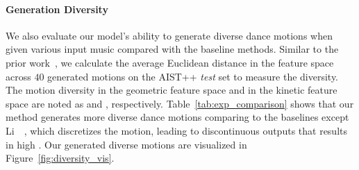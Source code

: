 \paragraph{Generation Diversity}
We also evaluate our model's ability to generate {diverse dance motions when given various input music} compared with the baseline methods. Similar to the prior work~\cite{huang2021}, we calculate the {average Euclidean distance in the feature space across} $40$ generated motions on the AIST++ \emph{test} set  to measure the diversity. The motion diversity in the geometric feature space and in the kinetic feature space are noted as \Divm and \Divk, respectively.
Table~\ref{tab:exp_comparison} shows that our method generates more diverse dance motions comparing to the baselines {except Li~\etal~\cite{li2020learning}, which discretizes the motion, leading to discontinuous outputs that results in high \Divk.} 
Our generated diverse motions are visualized in Figure~\ref{fig:diversity_vis}.

\vspace{-3mm}
